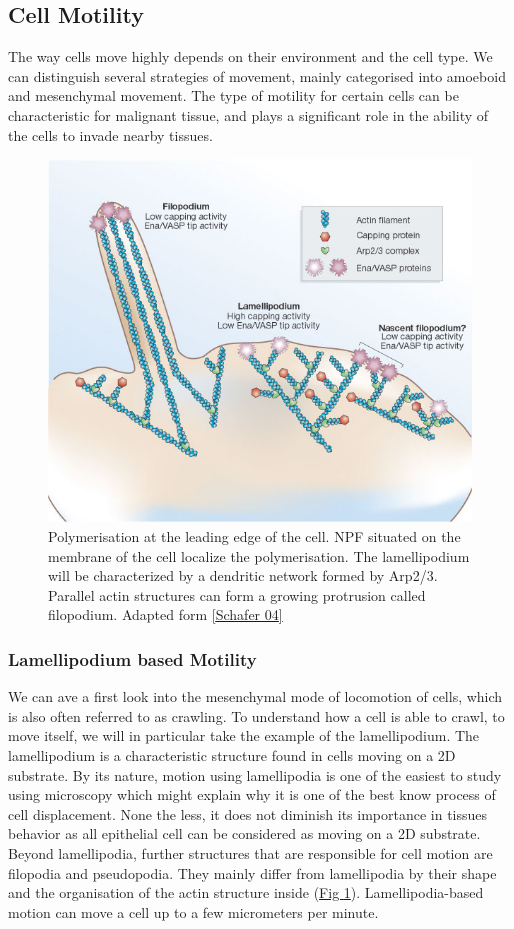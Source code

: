 \documentclass[A4paperpaper,11pt,english]{sphinxmanual}
\begin{document}
\subsection{Cell Motility}
\label{parts/part1:cell-motility}
The way cells move highly depends on their environment and the cell type.
We can distinguish several strategies of movement, mainly categorised into
amoeboid and mesenchymal movement. The type of motility for certain
cells can be characteristic for malignant tissue, and plays a significant role in
the ability of the cells to invade nearby tissues.
\begin{figure}[htbp]
\centering
\capstart

\includegraphics[width=0.600\linewidth]{Schafer2004.jpg}
\caption{Polymerisation at the leading edge of the cell. NPF situated on the
membrane of the cell localize the polymerisation. The lamellipodium will be
characterized by a dendritic network formed by Arp2/3. Parallel actin
structures can form a growing protrusion called filopodium.  Adapted form
{\hyperref[parts/part1:schafer2004]{{[}Schafer 04{]}}}}\label{parts/part1:fig-schafer}\end{figure}


\subsubsection{Lamellipodium based Motility}
\label{parts/part1:lamellipodium-based-motility}
We can ave a first look into the mesenchymal mode of locomotion of cells, which is
also often referred to as crawling. To understand how a cell is able to crawl,
to move itself, we will in particular take the example of the lamellipodium.
The lamellipodium is a characteristic structure found in cells moving on a 2D substrate. By
its nature, motion using lamellipodia is one of the easiest to study using
microscopy which might explain why it is one of the best know process of cell
displacement. None the less, it does not diminish its importance in tissues
behavior as all epithelial cell can be considered as moving on a 2D substrate.
Beyond lamellipodia, further structures that are responsible for cell motion are
filopodia and pseudopodia. They mainly differ from lamellipodia by their shape
and the organisation of the actin structure inside (\hyperref[parts/part1:fig-schafer]{Fig  \ref*{parts/part1:fig-schafer}}). Lamellipodia-based motion
can move a cell up to a few micrometers per minute.
\end{document}
